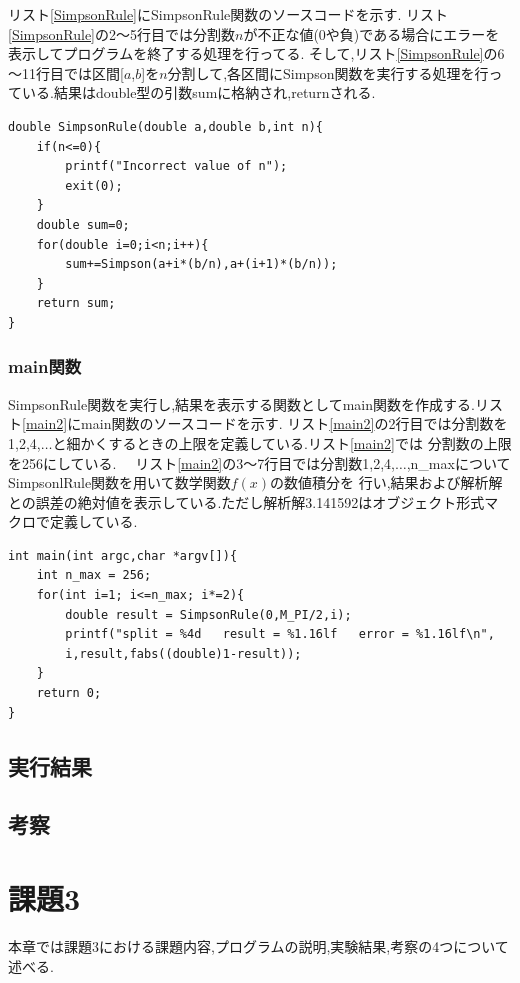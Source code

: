 \documentclass[dvipdfmx]{jarticle}
\begin{document}
      リスト\ref{SimpsonRule}にSimpsonRule関数のソースコードを示す.
      リスト\ref{SimpsonRule}の2～5行目では分割数$n$が不正な値(0や負)である場合にエラーを表示してプログラムを終了する処理を行ってる.
      そして,リスト\ref{SimpsonRule}の6～11行目では区間[$a$,$b$]を$n$分割して,各区間にSimpson関数を実行する処理を行っている.結果はdouble型の引数sumに格納され,returnされる.
      \begin{lstlisting}[basicstyle=\ttfamily\footnotesize, frame=single,label=SimpsonRule,caption=SimpsonRule関数]
double SimpsonRule(double a,double b,int n){
    if(n<=0){
        printf("Incorrect value of n");
        exit(0);
    }
    double sum=0;
    for(double i=0;i<n;i++){
        sum+=Simpson(a+i*(b/n),a+(i+1)*(b/n));
    }
    return sum;
}
            \end{lstlisting}

    \subsubsection{main関数}
    SimpsonRule関数を実行し,結果を表示する関数としてmain関数を作成する.リスト\ref{main2}にmain関数のソースコードを示す.
    リスト\ref{main2}の2行目では分割数を1,2,4,$\dots$と細かくするときの上限を定義している.リスト\ref{main2}では
    分割数の上限を256にしている.
    　リスト\ref{main2}の3～7行目では分割数1,2,4,$\dots$,n\_maxについてSimpsonlRule関数を用いて数学関数$f(x)$の数値積分を
    行い,結果および解析解との誤差の絶対値を表示している.ただし解析解3.141592はオブジェクト形式マクロで定義している.
      \begin{lstlisting}[basicstyle=\ttfamily\footnotesize, frame=single,label=main2,caption=main2関数]
int main(int argc,char *argv[]){
    int n_max = 256;
    for(int i=1; i<=n_max; i*=2){
        double result = SimpsonRule(0,M_PI/2,i);
        printf("split = %4d   result = %1.16lf   error = %1.16lf\n",
        i,result,fabs((double)1-result));
    }
    return 0;
}
            \end{lstlisting}

    \subsection{実行結果}
    \subsection{考察}

    \section{課題3}
    本章では課題3における課題内容,プログラムの説明,実験結果,考察の4つについて述べる.
\end{document}
